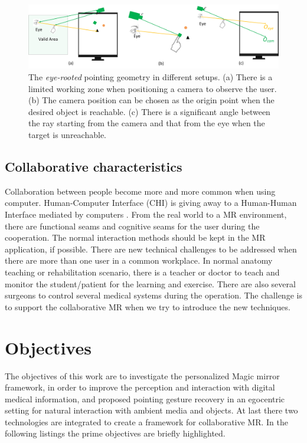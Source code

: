 \begin{figure} [htb]
	\centering
	\includegraphics[width= \linewidth]{figures/4-PAST/problem}
	\caption{The \textit{eye-rooted} pointing geometry in different setups. (a) There is a limited working zone when positioning a camera to observe the user. (b) The camera position can be chosen as the origin point when the desired object is reachable. (c) There is a significant angle between the ray starting from the camera and that from the eye when the target is unreachable.}
	\label{fig:1-intro:problem}
\end{figure}

\subsection{Collaborative characteristics}
Collaboration between people become more and more common when using computer. Human-Computer Interface (CHI) is giving away to a Human-Human Interface mediated by computers \cite{Billinghurst1999}. From the real world to a MR environment, there are functional seams and cognitive seams for the user during the cooperation. The normal interaction methods should be kept in the MR application, if possible.
There are new technical challenges to be addressed when there are more than one user in a common workplace.
In normal anatomy teaching or rehabilitation scenario, there is a teacher or doctor to teach and monitor the student/patient for the learning and exercise. There are also several surgeons to control several medical systems during the operation. The challenge is to support the collaborative MR when we try to introduce the new techniques.

\section{Objectives}
The objectives of this work are to investigate the personalized Magic mirror framework, in order to improve the perception and interaction with digital medical information, and proposed pointing gesture recovery in an egocentric setting for natural interaction with ambient media and objects. At last there two technologies are integrated to create a framework for collaborative MR.
In the following listings the prime objectives are briefly highlighted.

